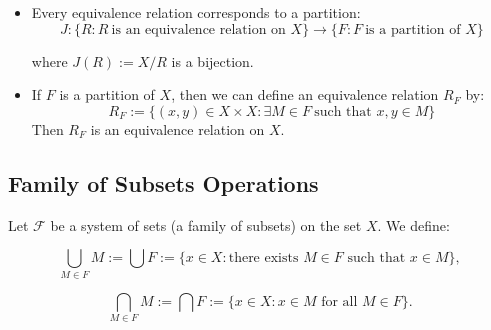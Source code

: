 \begin{itemize}[label=\(-\)]

	\item Every equivalence relation corresponds to a partition:
	      \[
		      J: \{ R : R\ \text{is an equivalence relation on } X\} \to \{ F: F\ \text{is a partition of } X\}
	      \]

	      where \( J(R) := X / R \) is a bijection.

	\item If \( F \) is a partition of \( X \), then we can define an equivalence relation \( R_F \) by:
	      \[
		      R_F := \{ (x, y) \in X \times X : \exists M \in F\ \text{such that } x, y \in M \}
	      \]
	      Then \( R_F \) is an equivalence relation on \( X \).

\end{itemize}


\subsection{Family of Subsets Operations}
Let \(\mathscr{F}\) be a system of sets (a family of subsets) on the set \( X \). We define:

\[
	\bigcup_{M \in F} M := \bigcup F := \{ x \in X : \text{there exists } M \in F \text{ such that } x \in M \} ,
\]

\[
	\bigcap_{M \in F} M := \bigcap F := \{ x \in X : x \in M \text{ for all } M \in F \} .
\]
\newpage